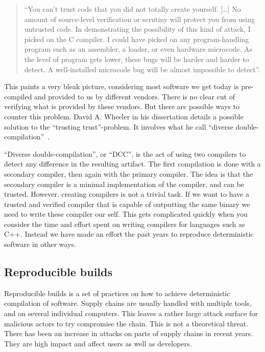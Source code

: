 \documentclass[../Main/thesis.tex]{subfiles}
\begin{document}
\begin{quotation}
``You can't trust code that you did not totally create yourself. [\ldots] No amount
of source-level verification or scrutiny will protect you from using untrusted
code. In demonstrating the possibility of this kind of attack, I picked on the C
compiler. I could have picked on any program-handling program such as an
assembler, a loader, or even hardware microcode. As the level of program gets
lower, these bugs will be harder and harder to detect. A well-installed
microcode bug will be almost impossible to
detect''\cite{Thompson:1984:RTT:358198.358210}.
\end{quotation}

This paints a very bleak picture, considering most software we get today is
pre-compiled and provided to us by different vendors. There is no clear cut of
verifying what is provided by these vendors. But there are possible ways to
counter this problem.  David A. Wheeler in his dissertation
 details a possible solution to the
``trusting trust''-problem. It involves what he call ``diverse
double-compilation''~\cite{Wheeler:2005:CTT:1106778.1106809}.

``Diverse double-compilation'', or ``DCC'', is the act of using two compilers to
detect any difference in the resulting artifact. The first compilation is done
with a secondary compiler, then again with the primary compiler. The idea is
that the secondary compiler is a minimal implementation of the compiler, and can
be trusted. However, creating compilers is not a trivial task. If we want to
have a trusted and verified compiler that is capable of outputting the same
binary we need to write these compiler our self. This gets complicated quickly
when you consider the time and effort spent on writing compilers for languages
such as C++. Instead we have made an effort the past years to reproduce
deterministic software in other ways.


\subsection*{Reproducible builds}
Reproducible builds is a set of practices on how to achieve deterministic
compilation of software. Supply chains are usually handled with multiple tools,
and on several individual computers. This leaves a rather large attack surface
for malicious actors to try compromise the chain. This is not a theoretical
threat. There has been an increase in attacks on parts of supply chains in
recent years. They are high impact and affect users as well as developers.
\end{document}
